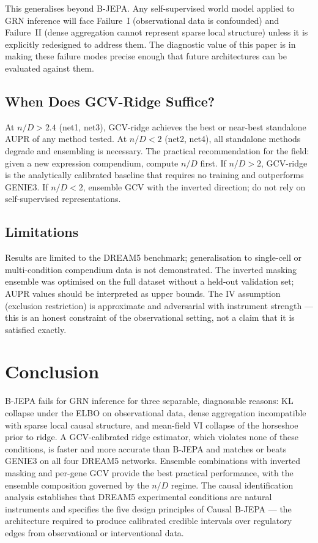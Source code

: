 \documentclass[11pt]{article}
\begin{document}
This generalises beyond B-JEPA.
Any self-supervised world model applied to GRN inference will face Failure~I
(observational data is confounded) and Failure~II (dense aggregation cannot
represent sparse local structure) unless it is explicitly redesigned to address
them.
The diagnostic value of this paper is in making these failure modes precise
enough that future architectures can be evaluated against them.

\subsection{When Does GCV-Ridge Suffice?}

At $n/D > 2.4$ (net1, net3), GCV-ridge achieves the best or near-best
standalone AUPR of any method tested.
At $n/D < 2$ (net2, net4), all standalone methods degrade and ensembling is
necessary.
The practical recommendation for the field: given a new expression compendium,
compute $n/D$ first.
If $n/D > 2$, GCV-ridge is the analytically calibrated baseline that requires
no training and outperforms GENIE3.
If $n/D < 2$, ensemble GCV with the inverted direction; do not rely on
self-supervised representations.

\subsection{Limitations}

Results are limited to the DREAM5 benchmark; generalisation to single-cell or
multi-condition compendium data is not demonstrated.
The inverted masking ensemble was optimised on the full dataset without a
held-out validation set; AUPR values should be interpreted as upper bounds.
The IV assumption (exclusion restriction) is approximate and adversarial with
instrument strength --- this is an honest constraint of the observational setting,
not a claim that it is satisfied exactly.

\section{Conclusion}

B-JEPA fails for GRN inference for three separable, diagnosable reasons:
KL collapse under the ELBO on observational data, dense aggregation
incompatible with sparse local causal structure, and mean-field VI collapse
of the horseshoe prior to ridge.
A GCV-calibrated ridge estimator, which violates none of these conditions, is
faster and more accurate than B-JEPA and matches or beats GENIE3 on all four
DREAM5 networks.
Ensemble combinations with inverted masking and per-gene GCV provide the best
practical performance, with the ensemble composition governed by the $n/D$ regime.
The causal identification analysis establishes that DREAM5 experimental
conditions are natural instruments and specifies the five design principles of
Causal B-JEPA --- the architecture required to produce calibrated credible
intervals over regulatory edges from observational or interventional data.
\end{document}
